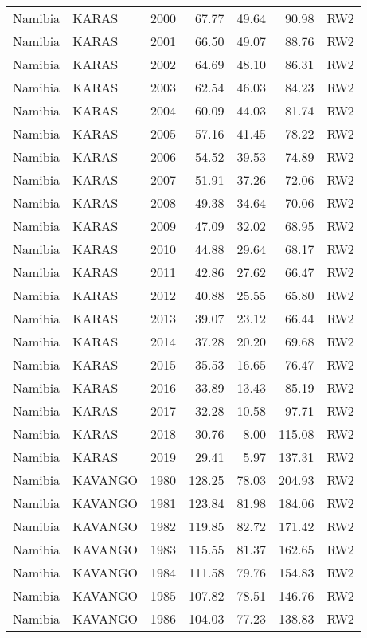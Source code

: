 \begin{longtable}{lllrrrl}
  Namibia & KARAS & 2000 & 67.77 & 49.64 & 90.98 & RW2 \\ 
  Namibia & KARAS & 2001 & 66.50 & 49.07 & 88.76 & RW2 \\ 
  Namibia & KARAS & 2002 & 64.69 & 48.10 & 86.31 & RW2 \\ 
  Namibia & KARAS & 2003 & 62.54 & 46.03 & 84.23 & RW2 \\ 
  Namibia & KARAS & 2004 & 60.09 & 44.03 & 81.74 & RW2 \\ 
  Namibia & KARAS & 2005 & 57.16 & 41.45 & 78.22 & RW2 \\ 
  Namibia & KARAS & 2006 & 54.52 & 39.53 & 74.89 & RW2 \\ 
  Namibia & KARAS & 2007 & 51.91 & 37.26 & 72.06 & RW2 \\ 
  Namibia & KARAS & 2008 & 49.38 & 34.64 & 70.06 & RW2 \\ 
  Namibia & KARAS & 2009 & 47.09 & 32.02 & 68.95 & RW2 \\ 
  Namibia & KARAS & 2010 & 44.88 & 29.64 & 68.17 & RW2 \\ 
  Namibia & KARAS & 2011 & 42.86 & 27.62 & 66.47 & RW2 \\ 
  Namibia & KARAS & 2012 & 40.88 & 25.55 & 65.80 & RW2 \\ 
  Namibia & KARAS & 2013 & 39.07 & 23.12 & 66.44 & RW2 \\ 
  Namibia & KARAS & 2014 & 37.28 & 20.20 & 69.68 & RW2 \\ 
  Namibia & KARAS & 2015 & 35.53 & 16.65 & 76.47 & RW2 \\ 
  Namibia & KARAS & 2016 & 33.89 & 13.43 & 85.19 & RW2 \\ 
  Namibia & KARAS & 2017 & 32.28 & 10.58 & 97.71 & RW2 \\ 
  Namibia & KARAS & 2018 & 30.76 & 8.00 & 115.08 & RW2 \\ 
  Namibia & KARAS & 2019 & 29.41 & 5.97 & 137.31 & RW2 \\ 
  Namibia & KAVANGO & 1980 & 128.25 & 78.03 & 204.93 & RW2 \\ 
  Namibia & KAVANGO & 1981 & 123.84 & 81.98 & 184.06 & RW2 \\ 
  Namibia & KAVANGO & 1982 & 119.85 & 82.72 & 171.42 & RW2 \\ 
  Namibia & KAVANGO & 1983 & 115.55 & 81.37 & 162.65 & RW2 \\ 
  Namibia & KAVANGO & 1984 & 111.58 & 79.76 & 154.83 & RW2 \\ 
  Namibia & KAVANGO & 1985 & 107.82 & 78.51 & 146.76 & RW2 \\ 
  Namibia & KAVANGO & 1986 & 104.03 & 77.23 & 138.83 & RW2 \\ 

\end{longtable}
